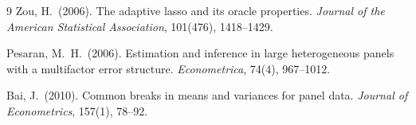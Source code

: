\documentclass[12pt, a4paper]{article}
\theoremstyle{plain}
\theoremstyle{definition}
\theoremstyle{remark}
\begin{document}
\begin{onehalfspacing}
\begin{thebibliography}{9}
Zou, H.\ (2006).
\newblock The adaptive lasso and its oracle properties.
\newblock \emph{Journal of the American Statistical Association}, 101(476),
  1418--1429.

Pesaran, M.\ H.\ (2006).
\newblock Estimation and inference in large heterogeneous panels with a
  multifactor error structure.
\newblock \emph{Econometrica}, 74(4), 967--1012.

Bai, J.\ (2010).
\newblock Common breaks in means and variances for panel data.
\newblock \emph{Journal of Econometrics}, 157(1), 78--92.

\end{thebibliography}

\end{onehalfspacing}
\end{document}
